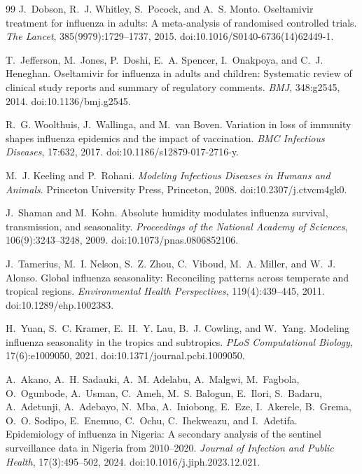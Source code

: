 \documentclass[12pt,a4paper]{article}
\theoremstyle{definition}
\theoremstyle{remark}
\begin{document}
\begin{thebibliography}{99}
J.~Dobson, R.~J. Whitley, S.~Pocock, and A.~S. Monto.
\newblock Oseltamivir treatment for influenza in adults: A meta-analysis of randomised controlled trials.
\newblock \emph{The Lancet}, 385(9979):1729--1737, 2015.
\newblock doi:10.1016/S0140-6736(14)62449-1.

T.~Jefferson, M.~Jones, P.~Doshi, E.~A. Spencer, I.~Onakpoya,
and C.~J. Heneghan.
\newblock Oseltamivir for influenza in adults and children: Systematic review of clinical study reports and summary of regulatory comments.
\newblock \emph{BMJ}, 348:g2545, 2014.
\newblock doi:10.1136/bmj.g2545.

R.~G. Woolthuis, J.~Wallinga, and M.~van Boven.
\newblock Variation in loss of immunity shapes influenza epidemics and the impact of vaccination.
\newblock \emph{BMC Infectious Diseases}, 17:632, 2017.
\newblock doi:10.1186/s12879-017-2716-y.

M.~J. Keeling and P.~Rohani.
\newblock \emph{Modeling Infectious Diseases in Humans and Animals}.
\newblock Princeton University Press, Princeton, 2008.
\newblock doi:10.2307/j.ctvcm4gk0.

J.~Shaman and M.~Kohn.
\newblock Absolute humidity modulates influenza survival, transmission, and seasonality.
\newblock \emph{Proceedings of the National Academy of Sciences},
106(9):3243--3248, 2009.
\newblock doi:10.1073/pnas.0806852106.

J.~Tamerius, M.~I. Nelson, S.~Z. Zhou, C.~Viboud, M.~A. Miller,
and W.~J. Alonso.
\newblock Global influenza seasonality: Reconciling patterns across temperate and tropical regions.
\newblock \emph{Environmental Health Perspectives}, 119(4):439--445, 2011.
\newblock doi:10.1289/ehp.1002383.

H.~Yuan, S.~C. Kramer, E.~H.~Y. Lau, B.~J. Cowling, and W.~Yang.
\newblock Modeling influenza seasonality in the tropics and subtropics.
\newblock \emph{PLoS Computational Biology}, 17(6):e1009050, 2021.
\newblock doi:10.1371/journal.pcbi.1009050.


A.~Akano, A.~H. Sadauki, A.~M. Adelabu, A.~Malgwi, M.~Fagbola, O.~Ogunbode,
A.~Usman, C.~Ameh, M.~S. Balogun, E.~Ilori, S.~Badaru, A.~Adetunji,
A.~Adebayo, N.~Mba, A.~Iniobong, E.~Eze, I.~Akerele, B.~Grema,
O.~O. Sodipo, E.~Enemuo, C.~Ochu, C.~Ihekweazu, and I.~Adetifa.
\newblock Epidemiology of influenza in Nigeria: A secondary analysis of the sentinel surveillance data in Nigeria from 2010--2020.
\newblock \emph{Journal of Infection and Public Health}, 17(3):495--502, 2024.
\newblock doi:10.1016/j.jiph.2023.12.021.




\end{thebibliography}
\end{document}
